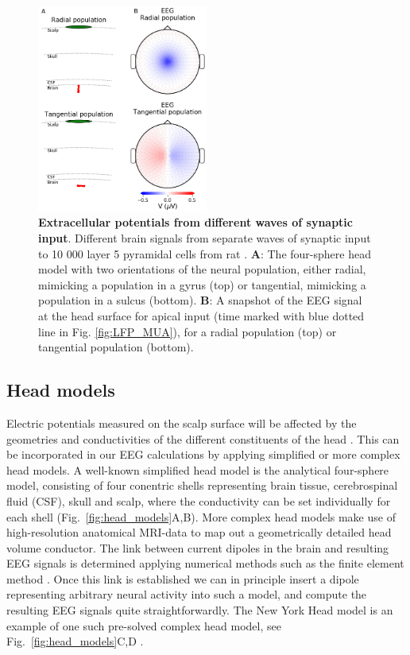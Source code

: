 \documentclass[preprint,11pt,authoryear]{elsarticle}
\begin{document}
\begin{figure}[!ht]
\begin{center}
\includegraphics[width=0.5\textwidth]{population_EEG_MEG_cut.png}
\end{center}
\caption{\textbf{Extracellular potentials from different waves of synaptic input}. Different brain signals from separate waves of synaptic input to 10 000 layer 5 pyramidal cells from rat \citep{Hay2011}.
{\bf A}: The four-sphere head model with two orientations of the neural population, either radial, mimicking a population in a gyrus (top) or tangential, mimicking a population in a sulcus (bottom).
{\bf B}: A snapshot of the EEG signal at the head surface for apical input (time marked with blue dotted line in Fig. \ref{fig:LFP_MUA}), for a radial population (top) or tangential population (bottom).
}
\label{fig:EEG_MEG}
\end{figure}

\subsection{Head models}
Electric potentials measured on the scalp surface will be affected by the geometries and conductivities of the different constituents of the head \citep{Nunez2006}. This can be incorporated in our EEG calculations by applying simplified or more complex head models.
A well-known simplified head model is the analytical four-sphere model, consisting of four conentric shells representing brain tissue, cerebrospinal fluid (CSF), skull and scalp, where the conductivity can be set individually for each shell \citep{Naess2017, Srinivasan1998, Nunez2006} (Fig.~\ref{fig:head_models}A,B).
More complex head models make use of high-resolution anatomical MRI-data to map out a geometrically detailed head volume conductor. The link between current dipoles in the brain and resulting EEG signals is determined applying numerical methods such as the finite element method \citep{Larson2013, Logg2012}. Once this link is established we can in principle insert a dipole representing arbitrary neural activity into such a model, and compute the resulting EEG signals quite straightforwardly. The New York Head model is an example of one such pre-solved complex head model, see Fig.~\ref{fig:head_models}C,D \citep{Huang2016}.
\end{document}
